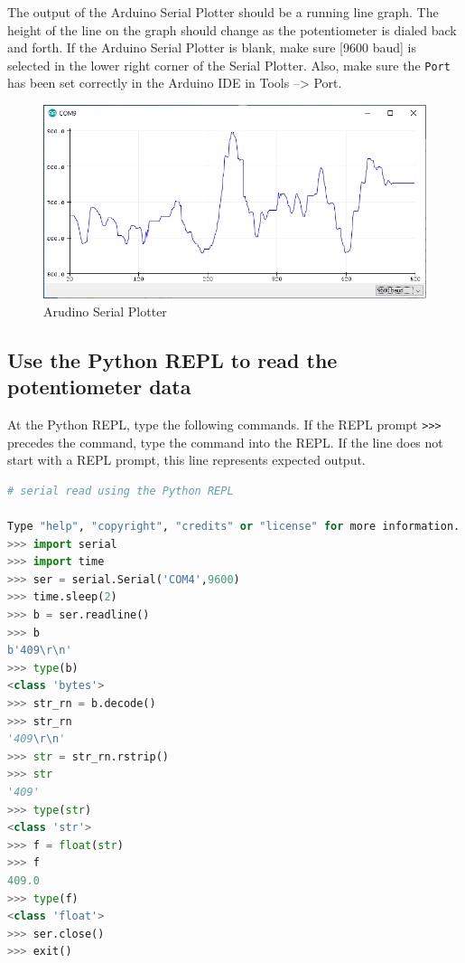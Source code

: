 \documentclass{book}
\makeatletter
\def\maxwidth{\ifdim\Gin@nat@width>\linewidth\linewidth
    \else\Gin@nat@width\fi}
\let\Oldincludegraphics\includegraphics
\renewcommand{\includegraphics}[1]{\Oldincludegraphics[width=.8\maxwidth]{#1}}
\makeatother
\begin{document}
The output of the Arduino Serial Plotter should be a running line graph.
The height of the line on the graph should change as the potentiometer
is dialed back and forth. If the Arduino Serial Plotter is blank, make
sure {[}9600 baud{]} is selected in the lower right corner of the Serial
Plotter. Also, make sure the \lstinline!Port! has been set correctly in
the Arduino IDE in Tools --\textgreater{} Port.

\begin{figure}
\centering
\includegraphics{images/serial_plotter_output.png}
\caption{Arudino Serial Plotter}
\end{figure}
    




    
        \subsection{Use the Python REPL to read the potentiometer
data}\label{use-the-python-repl-to-read-the-potentiometer-data}

At the Python REPL, type the following commands. If the REPL prompt
\lstinline!>>>! precedes the command, type the command into the REPL. If
the line does not start with a REPL prompt, this line represents
expected output.

\begin{lstlisting}[language=Python]
# serial read using the Python REPL

Type "help", "copyright", "credits" or "license" for more information.
>>> import serial
>>> import time
>>> ser = serial.Serial('COM4',9600)
>>> time.sleep(2)
>>> b = ser.readline()
>>> b
b'409\r\n'
>>> type(b)
<class 'bytes'>
>>> str_rn = b.decode()
>>> str_rn
'409\r\n'
>>> str = str_rn.rstrip()
>>> str
'409'
>>> type(str)
<class 'str'>
>>> f = float(str)
>>> f
409.0
>>> type(f)
<class 'float'>
>>> ser.close()
>>> exit()
\end{lstlisting}
    
\end{document}
